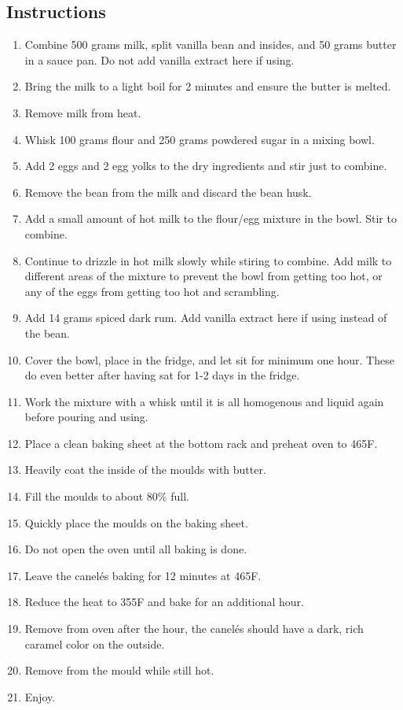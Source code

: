 \begin{multicols}{2}
\subsection*{Instructions}
\begin{enumerate}
    \item Combine 500 grams milk, split vanilla bean and insides, and 50 grams butter in a sauce pan. Do not add vanilla extract here if using.
    \item Bring the milk to a light boil for 2 minutes and ensure the butter is melted.
    \item Remove milk from heat.
    \item Whisk 100 grams flour and 250 grams powdered sugar in a mixing bowl.
    \item Add 2 eggs and 2 egg yolks to the dry ingredients and stir just to combine.
    \item Remove the bean from the milk and discard the bean husk.
    \item Add a small amount of hot milk to the flour/egg mixture in the bowl. Stir to combine.
    \item Continue to drizzle in hot milk slowly while stiring to combine. Add milk to different areas of the mixture to prevent the bowl from getting too hot, or any of the eggs from getting too hot and scrambling.
    \item Add 14 grams spiced dark rum. Add vanilla extract here if using instead of the bean.
    \item Cover the bowl, place in the fridge, and let sit for minimum one hour. These do even better after having sat for 1-2 days in the fridge.
    \item Work the mixture with a whisk until it is all homogenous and liquid again before pouring and using.
    \item Place a clean baking sheet at the bottom rack and preheat oven to 465F.
    \item Heavily coat the inside of the moulds with butter.
    \item Fill the moulds to about 80\% full.
    \item Quickly place the moulds on the baking sheet.
    \item Do not open the oven until all baking is done.
    \item Leave the canelés baking for 12 minutes at 465F.
    \item Reduce the heat to 355F and bake for an additional hour.
    \item Remove from oven after the hour, the canelés should have a dark, rich caramel color on the outside.
    \item Remove from the mould while still hot.
    \item Enjoy.
\end{enumerate}


\end{multicols}

